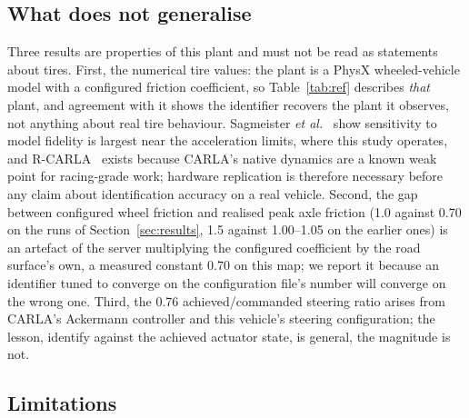 \subsection{What does not generalise}

Three results are properties of this plant and must not be read as statements
about tires. First, the numerical tire values: the plant is a PhysX
wheeled-vehicle model with a configured friction coefficient, so
Table~\ref{tab:ref} describes \emph{that} plant, and agreement with it shows
the identifier recovers the plant it observes, not anything about real tire
behaviour. Sagmeister \emph{et al.}~\cite{simfidelity2026} show sensitivity to
model fidelity is largest near the acceleration limits, where this study
operates, and R-CARLA~\cite{rcarla2025} exists because CARLA's native dynamics
are a known weak point for racing-grade work; hardware replication is therefore
necessary before any claim about identification accuracy on a real vehicle.
Second, the gap between configured wheel friction and realised peak axle
friction (\num{1.0} against \num{0.70} on the runs of
Section~\ref{sec:results}, \num{1.5} against \numrange{1.00}{1.05} on the
earlier ones) is an artefact of the server multiplying the configured
coefficient by the road surface's own, a measured constant \num{0.70} on this
map; we report it because an identifier tuned to converge on the configuration
file's number will converge on the wrong one. Third, the \num{0.76}
achieved/commanded steering ratio arises from CARLA's Ackermann controller and
this vehicle's steering configuration; the lesson, identify against the
achieved actuator state, is general, the magnitude is not.

\subsection{Limitations}
\label{subsec:limits}

